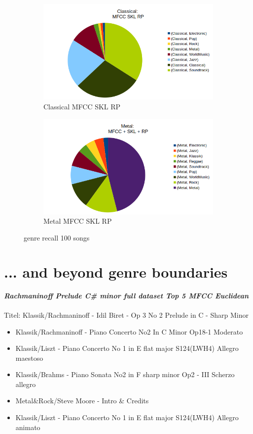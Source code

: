 \begin{figure}[htbp]
{{			\begin{subfigure}{.495\textwidth}
				\centering    
				\includegraphics[scale=0.3]{Images/SparkFeat/Classical_MFCC_SKL_RP.png}
				\caption{Classical MFCC SKL RP}
				\label{cmsr}
			\end{subfigure}
			\begin{subfigure}{.495\textwidth}
				\centering     
				\includegraphics[scale=0.3]{Images/SparkFeat/Metal_MFCC_SKL_RP.png}
				\caption{Metal MFCC SKL RP}
				\label{mfsr}
			\end{subfigure}%
	}}
	\caption{genre recall 100 songs}
	\label{fig:genrerec}
\end{figure}


\section{... and beyond genre boundaries}

\textit{\textbf{Rachmaninoff Prelude C\# minor full dataset Top 5 MFCC Euclidean\\}}
\\
Titel: Klassik/Rachmaninoff - Idil Biret - Op 3 No 2 Prelude in C - Sharp Minor
\begin{itemize}
\item Klassik/Rachmaninoff - Piano Concerto No2 In C Minor Op18-1 Moderato
\item Klassik/Liszt - Piano Concerto No 1 in E flat major S124(LWH4) Allegro maestoso
\item Klassik/Brahms - Piano Sonata No2 in F sharp minor Op2 - III Scherzo allegro
\item Metal\&Rock/Steve Moore - Intro \& Credits
\item Klassik/Liszt - Piano Concerto No 1 in E flat major S124(LWH4) Allegro animato
\end{itemize}

